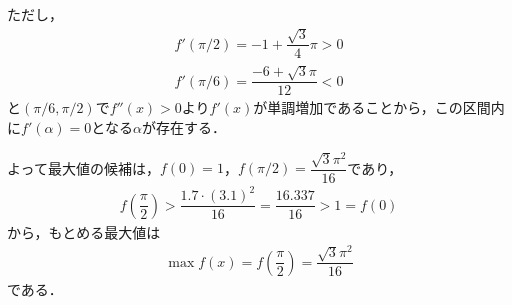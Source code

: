\documentclass[../../main.tex]{subfiles}
\begin{document}
ただし，
\begin{align}
  f'(\pi/2) = -1+\dfrac{\sqrt{3}}{4}\pi > 0 \\
  f'(\pi/6) = \dfrac{-6+\sqrt{3}\pi}{12} < 0
\end{align}
と$(\pi/6,\pi/2)$で$f''(x)>0$より$f'(x)$が単調増加であることから，この区間内に$f'(\alpha)=0$となる$\alpha$が存在する．

よって最大値の候補は，$f(0)=1$，$f(\pi/2)=\dfrac{\sqrt{3}\pi^2}{16}$であり，
\begin{align}
  f\left(\dfrac{\pi}{2}\right)>\dfrac{1.7\cdot(3.1)^2}{16}=\dfrac{16.337}{16}>1=f(0)
\end{align}
から，もとめる最大値は
\begin{align}
  \max f(x) =  f\left(\dfrac{\pi}{2}\right)=\dfrac{\sqrt{3}\pi^2}{16}
\end{align}
である．

\newpage
\end{document}
